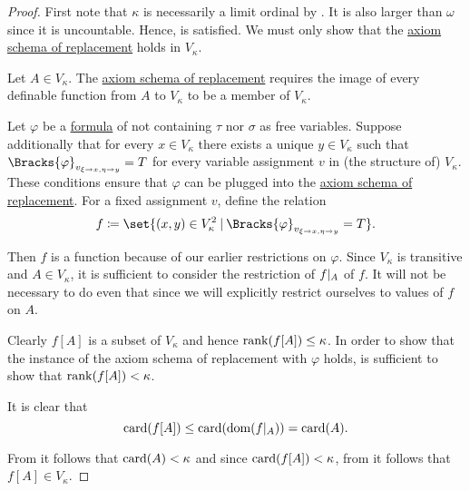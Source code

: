 \begin{proof}
  First note that \( \kappa \) is necessarily a limit ordinal by . It is also larger than \( \omega \) since it is uncountable. Hence,  is satisfied. We must only show that the \hyperref[def:zfc/replacement]{axiom schema of replacement} holds in \( V_\kappa \).

  Let \( A \in V_\kappa \). The \hyperref[def:zfc/replacement]{axiom schema of replacement} requires the image of every definable function from \( A \) to \( V_\kappa \) to be a member of \( V_\kappa \).

  Let \( \varphi \) be a \hyperref[def:first_order_syntax/formula]{formula} of \hyperref[def:zfc]{} not containing \( \tau \) nor \( \sigma \) as free variables. Suppose additionally that for every \( x \in V_\kappa \) there exists a unique \( y \in V_\kappa \) such that \( \Bracks{\varphi}_{v_{\xi \to x, \eta \to y}} = T \) for every variable assignment \( v \) in (the structure of) \( V_\kappa \). These conditions ensure that \( \varphi \) can be plugged into the \hyperref[def:zfc/replacement]{axiom schema of replacement}. For a fixed assignment \( v \), define the relation
  \begin{equation*}
    f \coloneqq \set{ (x, y) \in V_\kappa^2 \given \Bracks{\varphi}_{v_{\xi \to x, \eta \to y}} = T }.
  \end{equation*}

  Then \( f \) is a function because of our earlier restrictions on \( \varphi \). Since \( V_\kappa \) is transitive and \( A \in V_\kappa \), it is sufficient to consider the restriction of \( f\vert_A \) of \( f \). It will not be necessary to do even that since we will explicitly restrict ourselves to values of \( f \) on \( A \).

  Clearly \( f[A] \) is a subset of \( V_\kappa \) and hence \( \operatorname{rank}(f[A]) \leq \kappa \). In order to show that the instance of the axiom schema of replacement with \( \varphi \) holds, is sufficient to show that \( \operatorname{rank}(f[A]) < \kappa \).

  It is clear that
  \begin{equation*}
    \operatorname{card}(f[A]) \leq \operatorname{card}(\operatorname{dom}(f\vert_A)) = \operatorname{card}(A).
  \end{equation*}

  From  it follows that \( \operatorname{card}(A) < \kappa \) and since \( \operatorname{card}(f[A]) < \kappa \), from  it follows that \( f[A] \in V_\kappa \).
\end{proof}

